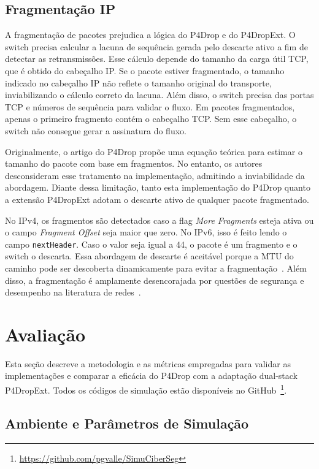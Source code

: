 \documentclass[12pt]{article}
\begin{document}
\subsection{Fragmentação IP}
\label{sec:p4de:frag}

A fragmentação de pacotes prejudica a lógica do P4Drop e do P4DropExt.
O switch precisa calcular a lacuna de sequência gerada pelo descarte ativo a fim de detectar as retransmissões.
Esse cálculo depende do tamanho da carga útil TCP, que é obtido do cabeçalho IP.
Se o pacote estiver fragmentado, o tamanho indicado no cabeçalho IP não reflete o tamanho original do transporte,
inviabilizando o cálculo correto da lacuna.
Além disso, o switch precisa das portas TCP e números de sequência para validar o fluxo.
Em pacotes fragmentados, apenas o primeiro fragmento contém o cabeçalho TCP.
Sem esse cabeçalho, o switch não consegue gerar a assinatura do fluxo.

Originalmente, o artigo do P4Drop propõe uma equação teórica para estimar o tamanho do pacote com base em fragmentos.
No entanto, os autores desconsideram esse tratamento na implementação, admitindo a inviabilidade da abordagem.
Diante dessa limitação, tanto esta implementação do P4Drop quanto a extensão P4DropExt adotam o descarte ativo de qualquer pacote fragmentado.

No IPv4, os fragmentos são detectados caso a flag \textit{More Fragments} esteja ativa ou o campo \textit{Fragment Offset} seja maior que zero.
No IPv6, isso é feito lendo o campo \texttt{nextHeader}.
Caso o valor seja igual a 44, o pacote é um fragmento e o switch o descarta.
Essa abordagem de descarte é aceitável porque a MTU do caminho pode ser descoberta dinamicamente para evitar a fragmentação~\cite{rfc1191, rfc8201}.
Além disso, a fragmentação é amplamente desencorajada por questões de segurança e desempenho na literatura de redes~\cite{rfc8900, rfc1858}.

\section{Avaliação}
\label{sec:avaliacao}

Esta seção descreve a metodologia e as métricas empregadas para validar as implementações
e comparar a eficácia do P4Drop com a adaptação dual-stack P4DropExt.
Todos os códigos de simulação estão disponíveis no GitHub~\footnote{\url{https://github.com/pgvalle/SimuCiberSeg}}.

\subsection{Ambiente e Parâmetros de Simulação}
\end{document}
